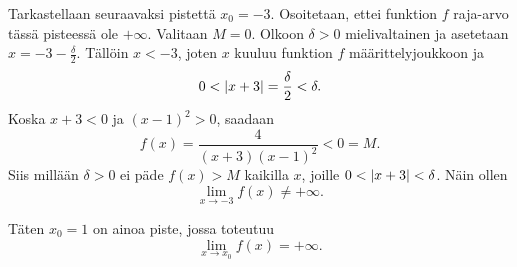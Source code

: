\documentclass[11pt,a4paper]{amsart}
\begin{document}
\begin{solution}
  Tarkastellaan seuraavaksi pistettä \(x_0 = -3\). Osoitetaan, ettei
  funktion \(f\) raja-arvo tässä pisteessä ole \(+\infty\).
  Valitaan \(M = 0\). Olkoon
  \(\delta > 0\) mielivaltainen ja asetetaan \(x = -3 - \frac{\delta}{2}\).
  Tällöin \(x < -3\), joten \(x\) kuuluu funktion \(f\) määrittelyjoukkoon ja
  \[
    0 < \lvert x + 3\rvert = \frac{\delta}{2} < \delta.
  \]
  Koska \(x + 3 < 0\) ja \((x - 1)^2 > 0\), saadaan
  \[
    f(x) = \frac{4}{(x + 3)(x - 1)^2} < 0 = M.
  \]
  Siis millään \(\delta > 0\) ei päde \(f(x) > M\) kaikilla \(x\), joille
  \(0 < \lvert x + 3\rvert < \delta\). Näin ollen
  \[
    \lim_{x \to -3} f(x) \neq +\infty.
  \]

  Täten \(x_0 = 1\) on ainoa piste, jossa toteutuu
  \[
    \lim_{x \to x_0} f(x) = +\infty.
  \]
\end{solution}
\end{document}
